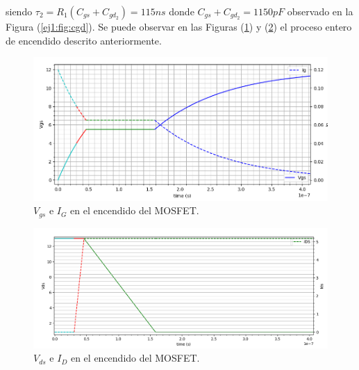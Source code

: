 siendo $\tau_2 = R_1(C_{gs} + C_{gd_2}) = 115ns$ donde $C_{gs} + C_{gd_2} = 1150pF$ observado en la Figura (\ref{ej1:fig:cgd}). Se puede observar en las Figuras (\ref{ej1:fig:encendido_gate}) y (\ref{ej1:fig:encendido_drain}) el proceso entero de encendido descrito anteriormente.

\begin{figure}[H]
	\centering
	\includegraphics[width=0.8\linewidth]{ImagenesEjercicio-1/encendido_gate}
	\caption{$V_{gs}$ e $I_G$ en el encendido del MOSFET.}
	\label{ej1:fig:encendido_gate}
\end{figure}

\begin{figure}[H]
	\centering
	\includegraphics[width=0.8\linewidth]{ImagenesEjercicio-1/encendido_drain}
	\caption{$V_{ds}$ e $I_D$ en el encendido del MOSFET.}
	\label{ej1:fig:encendido_drain}
\end{figure}

